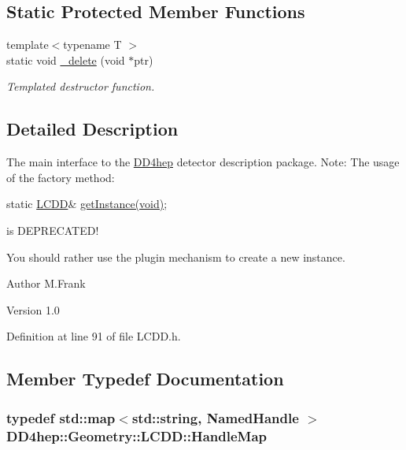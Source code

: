 \subsection*{Static Protected Member Functions}
\begin{DoxyCompactItemize}
\item 
{\footnotesize template$<$typename T $>$ }\\static void \hyperlink{class_d_d4hep_1_1_geometry_1_1_l_c_d_d_aa5ca16bda234eac32f855dfd93cf1cd3}{\_\-delete} (void $\ast$ptr)
\begin{DoxyCompactList}\small\item\em Templated destructor function. \item\end{DoxyCompactList}\end{DoxyCompactItemize}


\subsection{Detailed Description}
The main interface to the \hyperlink{namespace_d_d4hep}{DD4hep} detector description package. Note: The usage of the factory method:

static \hyperlink{class_d_d4hep_1_1_geometry_1_1_l_c_d_d}{LCDD}\& \hyperlink{class_d_d4hep_1_1_geometry_1_1_l_c_d_d_a4ba28eb0e53e15856d7a773c4ff758b9}{getInstance(void)};

is DEPRECATED!

You should rather use the plugin mechanism to create a new instance.

\begin{DoxyAuthor}{Author}
M.Frank 
\end{DoxyAuthor}
\begin{DoxyVersion}{Version}
1.0 
\end{DoxyVersion}


Definition at line 91 of file LCDD.h.

\subsection{Member Typedef Documentation}
\hypertarget{class_d_d4hep_1_1_geometry_1_1_l_c_d_d_a05cb11e7355772c7b0794bcca59bf477}{
\subsubsection[{HandleMap}]{\setlength{\rightskip}{0pt plus 5cm}typedef std::map$<$std::string, {\bf NamedHandle} $>$ {\bf DD4hep::Geometry::LCDD::HandleMap}}}
\label{class_d_d4hep_1_1_geometry_1_1_l_c_d_d_a05cb11e7355772c7b0794bcca59bf477}


